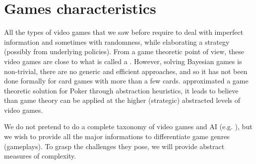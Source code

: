 
\section{Games characteristics}
All the types of video games that we saw before require to deal with imperfect information and sometimes with randomness, while elaborating a strategy (possibly from underlying policies). From a game theoretic point of view, these video games are close to what is called a  \citep{osborne-rubinstein}. %
However, solving Bayesian games is non-trivial, there are no generic and efficient approaches, and so it has not been done formally for card games with more than a few cards. \citet{BillingsBDHSSS03} approximated a game theoretic solution for Poker through abstraction heuristics, it leads to believe than game theory can be applied at the higher (strategic) abstracted levels of video games.

We do not pretend to do a complete taxonomy of video games and AI (e.g. \citep{gunn}), but we wish to provide all the major informations to differentiate game genres (gameplays). To grasp the challenges they pose, we will provide abstract measures of complexity.

